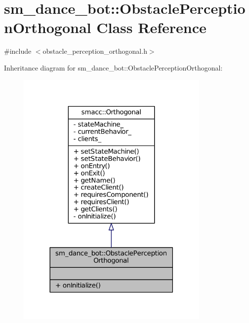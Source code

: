 \hypertarget{classsm__dance__bot_1_1ObstaclePerceptionOrthogonal}{}\section{sm\+\_\+dance\+\_\+bot\+:\+:Obstacle\+Perception\+Orthogonal Class Reference}
\label{classsm__dance__bot_1_1ObstaclePerceptionOrthogonal}


{\ttfamily \#include $<$obstacle\+\_\+perception\+\_\+orthogonal.\+h$>$}



Inheritance diagram for sm\+\_\+dance\+\_\+bot\+:\+:Obstacle\+Perception\+Orthogonal\+:
\nopagebreak
\begin{figure}[H]
\begin{center}
\leavevmode
\includegraphics[width=266pt]{classsm__dance__bot_1_1ObstaclePerceptionOrthogonal__inherit__graph}
\end{center}
\end{figure}


